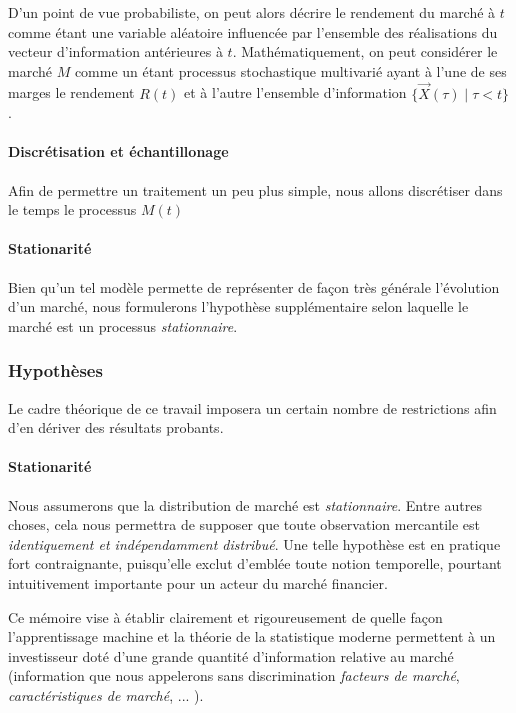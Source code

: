 D'un point de vue probabiliste, on peut alors décrire le rendement du marché à $t$ comme
étant une variable aléatoire influencée par l'ensemble des réalisations du vecteur
d'infor\-mation antérieures à $t$. Mathématiquement, on peut considérer le marché $M$
comme un étant processus stochastique multivarié ayant à l'une de ses marges le rendement
$R(t)$ et à l'autre l'ensemble d'information $\{\vec X(\tau) \mid \tau < t\}$.  


\paragraph{Discrétisation et échantillonage}

Afin de permettre un traitement un peu plus simple, nous allons discrétiser dans le temps
le processus $M(t)$


\paragraph{Stationarité}

Bien qu'un tel modèle permette de représenter de façon très générale l'évolution d'un
marché, nous formulerons l'hypothèse supplémentaire selon laquelle le marché est un
processus \textit{stationnaire}. 



\subsubsection{Hypothèses}

Le cadre théorique de ce travail imposera un certain nombre de restrictions afin d'en
dériver des résultats probants.

\paragraph{Stationarité}
Nous assumerons que la distribution de marché est \textit{stationnaire}. Entre autres
choses, cela nous permettra de supposer que toute observation mercantile est
\textit{identiquement et indépendamment distribué}\cit. Une telle hypothèse est en
pratique fort contraignante, puisqu'elle exclut d'emblée toute notion temporelle, pourtant
intuitivement importante pour un acteur du marché financier.


Ce mémoire vise à établir clairement et rigoureusement de quelle façon l'apprentissage
machine et la théorie de la statistique moderne permettent à un investisseur doté d'une
grande quantité d'information relative au marché (information que nous appelerons sans
discrimination \textit{facteurs de marché}, \textit{caractéristiques de marché},
... \cit).

